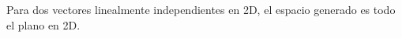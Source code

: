 \documentclass[preview]{standalone}
\begin{document}
\begin{center}
Para dos vectores linealmente independientes en 2D, el espacio generado es todo el plano en 2D.
\end{center}
\end{document}
